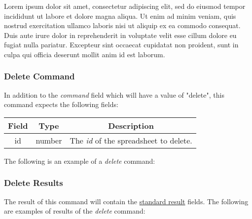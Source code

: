 Lorem ipsum dolor sit amet, consectetur adipiscing elit, sed do eiusmod tempor incididunt ut labore et dolore magna aliqua. Ut enim ad minim veniam, quis nostrud exercitation ullamco laboris nisi ut aliquip ex ea commodo consequat. Duis aute irure dolor in reprehenderit in voluptate velit esse cillum dolore eu fugiat nulla pariatur. Excepteur sint occaecat cupidatat non proident, sunt in culpa qui officia deserunt mollit anim id est laborum.

\subsubsection{Delete Command}
In addition to the \emph{command} field which will have a value of "delete", this command expects the following fields:

\begin{table}[H]
    \begin{center}
        \begin{tabular}{|c|c|c|}\hline
            Field & Type & Description \\\hline
            id & number & The \emph{id} of the spreadsheet to delete. \\\hline
        \end{tabular}
    \end{center}
\end{table}

The following is an example of a \emph{delete} command:



\subsubsection{Delete Results}
The result of this command will contain the \hyperref[sec:message:result]{standard result} fields.
The following are examples of results of the \emph{delete} command:





